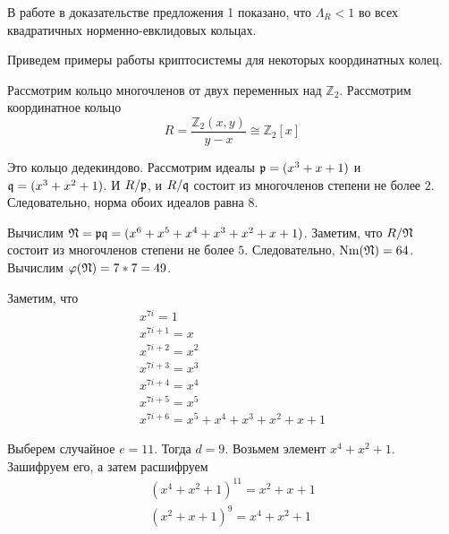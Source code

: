 \documentclass[_00_dissertation.tex]{subfiles}
\begin{document}
\begin{remark}
    В работе \cite{source:Vaskouski_CSIST} в доказательстве предложения 1 показано, что $\Lambda_{R} < 1$ во всех квадратичных норменно-евклидовых кольцах.
\end{remark}

Приведем примеры работы криптосистемы для некоторых координатных колец.

\begin{example}
	Рассмотрим кольцо многочленов от двух переменных над $\mathbb{Z}_2$.
	Рассмотрим координатное кольцо
	\begin{equation*}
		R = \frac{\mathbb{Z}_2(x, y)}{y-x} \cong \mathbb{Z}_2[x]
	\end{equation*}
	
	Это кольцо дедекиндово.
	Рассмотрим идеалы $\mathfrak{p} = (x^3 + x + 1)$ и $\mathfrak{q} = (x^3 + x^2 + 1)$.
	И $R/\mathfrak{p}$, и $R/\mathfrak{q}$ состоит из многочленов степени не более $2$.
	Следовательно, норма обоих идеалов равна $8$.
	
	Вычислим $\mathfrak{N} = \mathfrak{p}\mathfrak{q} = (x^6 + x^5 + x^4 + x^3 + x^2 + x + 1)$.
	Заметим, что $R/\mathfrak{N}$ состоит из многочленов степени не более $5$.
	Следовательно, $\textrm{Nm}(\mathfrak{N}) = 64$.
	Вычислим $\varphi(\mathfrak{N}) = 7 * 7 = 49$.

	Заметим, что
	\begin{equation*}
		\begin{array}{l}
			x^{7i} = 1\\
			x^{7i+1} = x\\
			x^{7i+2} = x^2\\
			x^{7i+3} = x^3\\
			x^{7i+4} = x^4\\
			x^{7i+5} = x^5\\
			x^{7i+6} = x^5 + x^4 + x^3 + x^2 + x + 1
		\end{array}
	\end{equation*}

	Выберем случайное $e = 11$.
	Тогда $d = 9$.
	Возьмем элемент $x^4 + x^2 + 1$.
	Зашифруем его, а затем расшифруем
	\begin{equation*}
	    \begin{split}
    		(x^4 + x^2 + 1)^{11} = x^2 + x + 1\\
    		(x^2 + x + 1)^{9} = x^4 + x^2 + 1
	    \end{split}
	\end{equation*}
\end{example}
\end{document}
